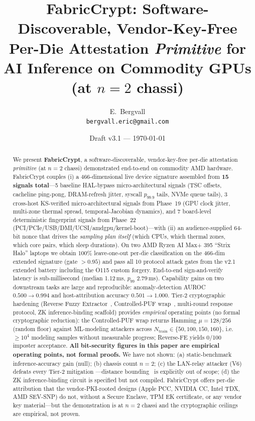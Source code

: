 \documentclass[11pt,letterpaper]{article}
\title{FabricCrypt: Software-Discoverable, Vendor-Key-Free Per-Die
       Attestation \emph{Primitive} for AI Inference on Commodity GPUs
       (at $n=2$ chassi)}
\author{E.\ Bergvall \\ \texttt{bergvall.eric@gmail.com}}
\date{Draft v3.1 --- \today}
\begin{document}
\maketitle

\begin{abstract}
We present \textbf{FabricCrypt}, a software-discoverable, vendor-key-free
per-die attestation \emph{primitive} (at $n=2$ chassi) demonstrated
end-to-end on commodity AMD hardware. FabricCrypt couples (i) a
466-dimensional live device signature assembled from \textbf{15 signals
total}---5 baseline HAL-bypass micro-architectural signals (TSC offsets,
cacheline ping-pong, DRAM-refresh jitter, syscall $p_{99.9}$ tails, NVMe
queue tails), 3 cross-host KS-verified micro-architectural signals from
Phase~19 (GPU clock jitter, multi-zone thermal spread, temporal-Jacobian
dynamics), and 7 board-level deterministic fingerprint signals from
Phase~22 (PCI/PCIe/USB/DMI/UCSI/amdgpu/kernel-boot)---with (ii) an
audience-supplied 64-bit nonce that drives the \emph{sampling plan
itself} (which CPUs, which thermal zones, which core pairs, which sleep
durations). On two AMD Ryzen AI Max+ 395 ``Strix Halo'' laptops we obtain
100\% leave-one-out per-die classification on the 466-dim extended
signature (gate $>0.95$) and pass all 10 protocol attack gates from the
v2.1 extended battery including the O115 custom forgery. End-to-end
sign-and-verify latency is sub-millisecond (median 1.12\,ms,
$p_{99}$ 2.79\,ms). Capability gains on two downstream tasks are large
and reproducible: anomaly-detection AUROC $0.500 \to 0.994$ and
host-attribution accuracy $0.501 \to 1.000$. Tier-2 cryptographic
hardening (Reverse Fuzzy Extractor~\cite{VanHerrewege2012},
Controlled-PUF wrap~\cite{Suh2007}, multi-round response protocol, ZK
inference-binding scaffold) provides \emph{empirical} operating points
(no formal cryptographic reduction): the Controlled-PUF wrap returns
Hamming $\mu = 128/256$ (random floor) against ML-modeling attackers
across $N_{\text{train}} \in \{50, 100, 150, 160\}$, i.e.\ $\geq 10^4$
modeling samples without measurable progress; Reverse-FE yields 0/100
imposter acceptance. \textbf{All bit-security figures in this paper are
empirical operating points, not formal proofs.} We have not shown:
(a) static-benchmark inference-accuracy gain (null); (b) chassis count
$n=2$; (c) the LAN-relay attacker (V6) defeats every Tier-2 mitigation
---distance bounding~\cite{Brands1993} is explicitly out of scope;
(d) the ZK inference-binding circuit is specified but not compiled.
FabricCrypt offers per-die attribution that the vendor-PKI-rooted
designs (Apple PCC, NVIDIA CC, Intel TDX, AMD SEV-SNP) do not, without a
Secure Enclave, TPM EK certificate, or any vendor key material---but the
demonstration is at $n=2$ chassi and the cryptographic ceilings are
empirical, not proven.
\end{abstract}
\end{document}

